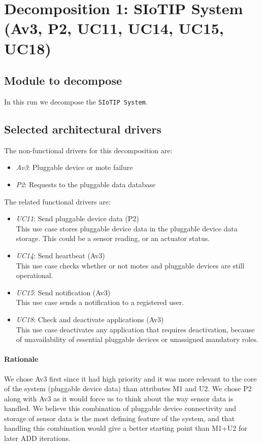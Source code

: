 \section{Decomposition 1: SIoTIP System (Av3, P2, UC11, UC14, UC15, UC18)}
\subsection{Module to decompose}
    In this run we decompose the \texttt{SIoTIP System}.

\subsection{Selected architectural drivers}
    The non-functional drivers for this decomposition are:
    \begin{itemize}
    	\item \emph{Av3}: Pluggable device or mote failure
    	\item \emph{P2}: Requests to the pluggable data database
    \end{itemize}

    \noindent The related functional drivers are:
    \begin{itemize}
        \item \emph{UC11}: Send pluggable device data (P2) \\
              This use case stores pluggable device data in the pluggable device data storage.
              This could be a sensor reading, or an actuator status.
    	\item \emph{UC14}: Send heartbeat (Av3) \\
              This use case checks whether or not motes and pluggable devices
              are still operational.
    	\item \emph{UC15}: Send notification (Av3) \\
              This use case sends a notification to a registered user.
    	\item \emph{UC18}: Check and deactivate applications (Av3) \\
              This use case deactivates any application that requires deactivation,
              because of unavailability of essential pluggable devices
              or unassigned mandatory roles.
    \end{itemize}

    \paragraph{Rationale}
    We chose Av3 first since it had high priority and it was more relevant to
    the core of the system (pluggable device data) than attributes M1 and U2. We
    chose P2 along with Av3 as it would force us to think about the way
    sensor data is handled. We believe this combination of pluggable device connectivity and
    storage of sensor data is the most defining feature of the system, and that
    handling this combination would give a better starting point than M1+U2
    for later ADD iterations.


